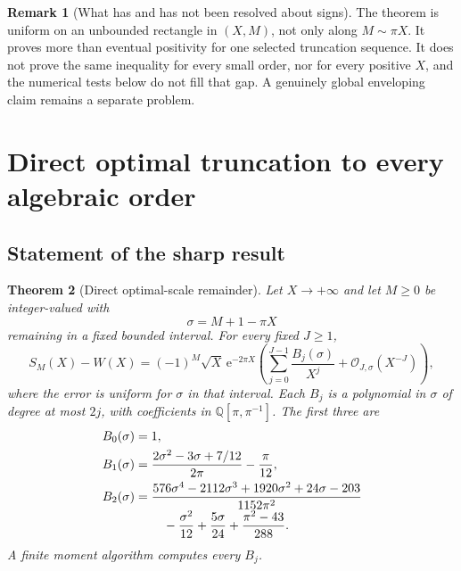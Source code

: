 \documentclass[11pt,a4paper]{article}
\newtheorem{theorem}{Theorem}[section]
\theoremstyle{definition}
\newtheorem{remark}[theorem]{Remark}
\numberwithin{equation}{section}
\newcommand{\ee}{\mathrm{e}}
\newcommand{\Oh}{\mathcal O}
\begin{document}
\begin{remark}[What has and has not been resolved about signs]
The theorem is uniform on an unbounded rectangle in $(X,M)$, not only along $M\sim\pi X$. It proves more than eventual positivity for one selected truncation sequence. It does not prove the same inequality for every small order, nor for every positive $X$, and the numerical tests below do not fill that gap. A genuinely global enveloping claim remains a separate problem.
\end{remark}

\section{Direct optimal truncation to every algebraic order}
\label{sec:optimal}

\subsection{Statement of the sharp result}
\begin{theorem}[Direct optimal-scale remainder]
\label{thm:optimal}
Let $X\to+\infty$ and let $M\ge0$ be integer-valued with
\begin{equation}
 \sigma=M+1-\pi X
 \label{eq:sigma}
\end{equation}
remaining in a fixed bounded interval. For every fixed $J\ge1$,
\begin{equation}
 S_M(X)-W(X)=(-1)^M\sqrt X\,\ee^{-2\pi X}
 \left(\sum_{j=0}^{J-1}\frac{B_j(\sigma)}{X^j}
             +\Oh_{J,\sigma}(X^{-J})\right),
 \label{eq:optimal-all}
\end{equation}
where the error is uniform for $\sigma$ in that interval. Each $B_j$ is a polynomial in $\sigma$ of degree at most $2j$, with coefficients in $\mathbb Q[\pi,\pi^{-1}]$. The first three are
\begin{align}
 B_0(\sigma)&=1,\notag\\
 B_1(\sigma)&=\frac{2\sigma^2-3\sigma+7/12}{2\pi}-\frac\pi{12},
 \label{eq:B1}\\
 B_2(\sigma)&=
 \frac{576\sigma^4-2112\sigma^3+1920\sigma^2+24\sigma-203}{1152\pi^2}
 \notag\\[-1mm]
 &\hspace{8mm}-\frac{\sigma^2}{12}+\frac{5\sigma}{24}
       +\frac{\pi^2-43}{288}.
 \label{eq:B2}
\end{align}
A finite moment algorithm computes every $B_j$.
\end{theorem}
\end{document}
